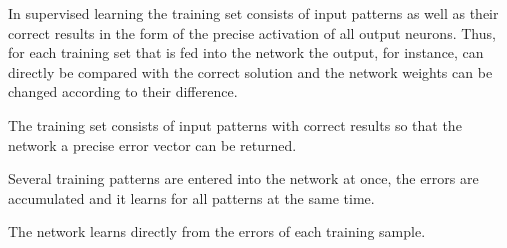 In supervised learning the training set consists of input patterns as well as their correct results in the form of the precise activation of all output neurons. Thus, for each training set that is fed into the network the output, for instance, can directly be compared with the correct solution and the network weights can be changed according to their difference.
\begin{definition}
    The training set consists of input patterns with correct results so that the network a precise error vector can be returned.
\end{definition}
\begin{definition}
    Several training patterns are entered into the network at once, the errors are accumulated and it learns for all patterns at the same time.
\end{definition}
\begin{definition}
    The network learns directly from the errors of each training sample.
\end{definition}
